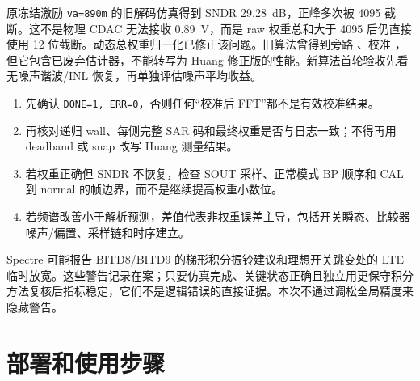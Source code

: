 \documentclass[UTF8,a4paper,11pt]{ctexart}
\newcommand{\code}[1]{\texttt{#1}}
\begin{document}
原冻结激励 \code{va=890m} 的旧解码仿真得到 SNDR \SI{29.28}{dB}，正峰多次被 4095 截断。这不是物理 CDAC 无法接收 \SI{0.89}{V}，而是 raw 权重总和大于 4095 后仍直接使用 12 位截断。动态总权重归一化已修正该问题。旧算法曾得到旁路 \BaselineSNDR、校准 \CalibratedSNDR，但它包含已废弃估计器，不能转写为 Huang 修正版的性能。新算法首轮验收先看无噪声谐波/INL 恢复，再单独评估噪声平均收益。
\begin{enumerate}
  \item 先确认 \code{DONE=1, ERR=0}，否则任何“校准后 FFT”都不是有效校准结果。
  \item 再核对递归 wall、每侧完整 SAR 码和最终权重是否与日志一致；不得再用 deadband 或 snap 改写 Huang 测量结果。
  \item 若权重正确但 SNDR 不恢复，检查 SOUT 采样、正常模式 BP 顺序和 CAL 到 normal 的帧边界，而不是继续提高权重小数位。
  \item 若频谱改善小于解析预测，差值代表非权重误差主导，包括开关瞬态、比较器噪声/偏置、采样链和时序建立。
\end{enumerate}

Spectre 可能报告 BITD8/BITD9 的梯形积分振铃建议和理想开关跳变处的 LTE 临时放宽。这些警告记录在案；只要仿真完成、关键状态正确且独立用更保守积分方法复核后指标稳定，它们不是逻辑错误的直接证据。本次不通过调松全局精度来隐藏警告。

\section{部署和使用步骤}
\end{document}
